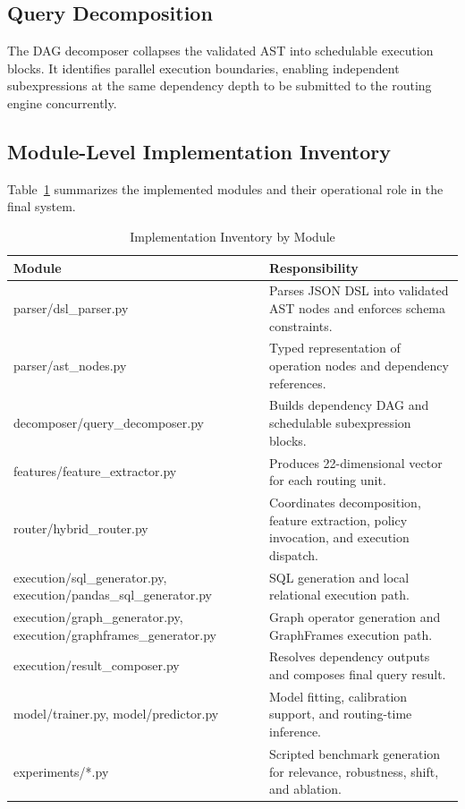 \documentclass[conference]{IEEEtran}
\begin{document}
\subsection{Query Decomposition}
The DAG decomposer collapses the validated AST into schedulable execution blocks. It identifies parallel execution boundaries, enabling independent subexpressions at the same dependency depth to be submitted to the routing engine concurrently.

\subsection{Module-Level Implementation Inventory}
Table~\ref{tab:modules_inventory} summarizes the implemented modules and their operational role in the final system.

\begin{table}[h]
\centering
\caption{Implementation Inventory by Module}
\label{tab:modules_inventory}
\begin{tabularx}{\columnwidth}{lX}
\toprule
Module & Responsibility \\
\midrule
parser/dsl\_parser.py & Parses JSON DSL into validated AST nodes and enforces schema constraints. \\
parser/ast\_nodes.py & Typed representation of operation nodes and dependency references. \\
decomposer/query\_decomposer.py & Builds dependency DAG and schedulable subexpression blocks. \\
features/feature\_extractor.py & Produces 22-dimensional vector for each routing unit. \\
router/hybrid\_router.py & Coordinates decomposition, feature extraction, policy invocation, and execution dispatch. \\
execution/sql\_generator.py, execution/pandas\_sql\_generator.py & SQL generation and local relational execution path. \\
execution/graph\_generator.py, execution/graphframes\_generator.py & Graph operator generation and GraphFrames execution path. \\
execution/result\_composer.py & Resolves dependency outputs and composes final query result. \\
model/trainer.py, model/predictor.py & Model fitting, calibration support, and routing-time inference. \\
experiments/*.py & Scripted benchmark generation for relevance, robustness, shift, and ablation. \\
\bottomrule
\end{tabularx}
\end{table}
\end{document}
